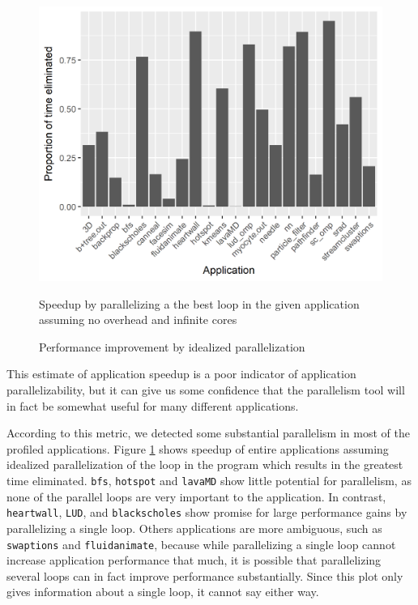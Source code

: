 \documentclass[12pt,twoside]{reedthesis}
\begin{document}
		\begin{figure}
			\caption{Performance improvement by idealized parallelization}%
			\label{fig:application-parr}
			
			\begin{minipage}{0.73\textwidth} %
				\includegraphics[scale=0.9]{plots/application_idealized_speedup.png}
				{\footnotesize Speedup by parallelizing a the best loop in the given application assuming no overhead and infinite cores\par}
			\end{minipage}
		\end{figure}
		This estimate of application speedup is a poor indicator of application parallelizability, %
		but it can give us some confidence that the parallelism tool will in fact be somewhat useful for many different applications. 
				
		According to this metric, we detected some substantial parallelism in most of the profiled applications. 
		Figure \ref{fig:application-parr} shows speedup of entire applications assuming idealized parallelization of the loop in the program which results in the greatest time eliminated. \texttt{bfs}, \texttt{hotspot} and \texttt{lavaMD} show little potential for parallelism, as none of the parallel loops are very important to the application. In contrast, \texttt{heartwall}, \texttt{LUD}, and \texttt{blackscholes} show promise for large performance gains by parallelizing a single loop. Others applications are more ambiguous, such as \texttt{swaptions} and \texttt{fluidanimate}, because while parallelizing a single loop cannot increase application performance that much, it is possible that parallelizing several loops can in fact improve performance substantially. Since this plot only gives information about a single loop, it cannot say either way.
		
\end{document}
